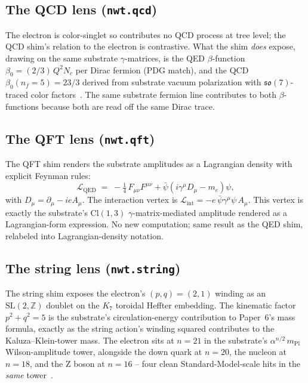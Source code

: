 \documentclass[11pt]{article}
\newcommand{\so}{\mathfrak{so}}
\newcommand{\mPl}{m_{\mathrm{Pl}}}
\newcommand{\Z}{\mathbb{Z}}
\begin{document}
\subsection{The QCD lens (\texttt{nwt.qcd})}

The electron is color-singlet so contributes no QCD process at
tree level; the QCD shim's relation to the electron is contrastive.
What the shim \emph{does} expose, drawing on the same substrate
$\gamma$-matrices, is the QED $\beta$-function
$\beta_0 = (2/3)\,Q^2 N_c$ per Dirac fermion (PDG match), and the
QCD $\beta_0(n_f = 5) = 23/3$ derived from substrate vacuum
polarization with $\so(7)$-traced color factors~\cite{paper17}.
The same substrate fermion line contributes to both
$\beta$-functions because both are read off the same Dirac trace.

\subsection{The QFT lens (\texttt{nwt.qft})}

The QFT shim renders the substrate amplitudes as a Lagrangian
density with explicit Feynman rules:
\begin{equation}
  \mathcal{L}_{\mathrm{QED}}
   \;=\;
   -\tfrac{1}{4}\,F_{\mu\nu}F^{\mu\nu}
   + \bar\psi(i\gamma^\mu D_\mu - m_e)\psi,
\end{equation}
with $D_\mu = \partial_\mu - i e A_\mu$.  The interaction vertex is
$\mathcal{L}_{\mathrm{int}} = -e\,\bar\psi\gamma^\mu\psi\,A_\mu$.
This vertex is exactly the substrate's $\mathrm{Cl}(1,3)$
$\gamma$-matrix-mediated amplitude rendered as a Lagrangian-form
expression.  No new computation; same result as the QED shim,
relabeled into Lagrangian-density notation.

\subsection{The string lens (\texttt{nwt.string})}

The string shim exposes the electron's $(p, q) = (2, 1)$ winding
as an $\mathrm{SL}(2,\Z)$ doublet on the $K_7$ toroidal Heffter
embedding.  The kinematic factor $p^2 + q^2 = 5$ is the
substrate's circulation-energy contribution to Paper~6's mass
formula, exactly as the string action's winding squared
contributes to the Kaluza--Klein-tower mass.  The electron sits at
$n = 21$ in the substrate's $\alpha^{n/2}\,\mPl$ Wilson-amplitude
tower, alongside the down quark at $n = 20$, the nucleon at
$n = 18$, and the Z boson at $n = 16$ -- four clean
Standard-Model-scale hits in the \emph{same} tower~\cite{paper17}.
\end{document}
